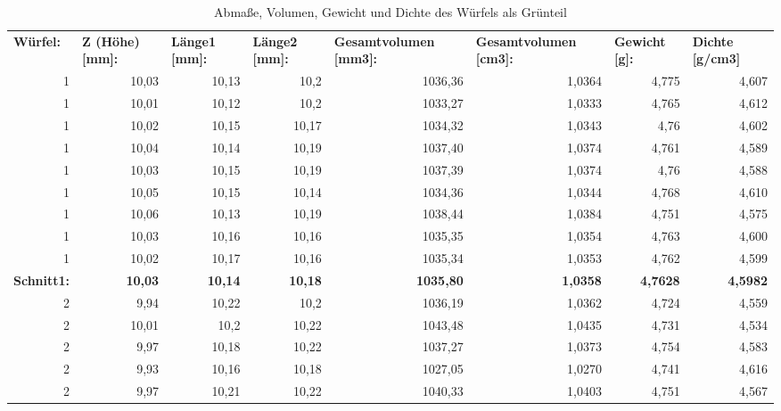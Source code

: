 \begin{table}[htbp]
    \centering
    \caption{Abmaße, Volumen, Gewicht und Dichte des Würfels als Grünteil}
      \begin{tabular}{lrrrrrrr}
      \toprule
      \textbf{Würfel:} & \multicolumn{1}{l}{\textbf{Z (Höhe) [mm]:}} & \multicolumn{1}{l}{\textbf{Länge1 [mm]:}} & \multicolumn{1}{l}{\textbf{Länge2 [mm]:}} & \multicolumn{1}{l}{\textbf{Gesamtvolumen [mm3]:}} & \multicolumn{1}{l}{\textbf{Gesamtvolumen [cm3]:}} & \multicolumn{1}{l}{\textbf{Gewicht [g]:}} & \multicolumn{1}{l}{\textbf{Dichte [g/cm3]}} \\
      \multicolumn{1}{r}{1} & 10,03 & 10,13 & 10,2  & 1036,36 & 1,0364 & 4,775 & 4,607 \\
      \multicolumn{1}{r}{1} & 10,01 & 10,12 & 10,2  & 1033,27 & 1,0333 & 4,765 & 4,612 \\
      \multicolumn{1}{r}{1} & 10,02 & 10,15 & 10,17 & 1034,32 & 1,0343 & 4,76  & 4,602 \\
      \multicolumn{1}{r}{1} & 10,04 & 10,14 & 10,19 & 1037,40 & 1,0374 & 4,761 & 4,589 \\
      \multicolumn{1}{r}{1} & 10,03 & 10,15 & 10,19 & 1037,39 & 1,0374 & 4,76  & 4,588 \\
      \multicolumn{1}{r}{1} & 10,05 & 10,15 & 10,14 & 1034,36 & 1,0344 & 4,768 & 4,610 \\
      \multicolumn{1}{r}{1} & 10,06 & 10,13 & 10,19 & 1038,44 & 1,0384 & 4,751 & 4,575 \\
      \multicolumn{1}{r}{1} & 10,03 & 10,16 & 10,16 & 1035,35 & 1,0354 & 4,763 & 4,600 \\
      \multicolumn{1}{r}{1} & 10,02 & 10,17 & 10,16 & 1035,34 & 1,0353 & 4,762 & 4,599 \\
      \textbf{Schnitt1:} & \textbf{10,03} & \textbf{10,14} & \textbf{10,18} & \textbf{1035,80} & \textbf{1,0358} & \textbf{4,7628} & \textbf{4,5982} \\
      \midrule
      \multicolumn{1}{r}{2} & 9,94  & 10,22 & 10,2  & 1036,19 & 1,0362 & 4,724 & 4,559 \\
      \multicolumn{1}{r}{2} & 10,01 & 10,2  & 10,22 & 1043,48 & 1,0435 & 4,731 & 4,534 \\
      \multicolumn{1}{r}{2} & 9,97  & 10,18 & 10,22 & 1037,27 & 1,0373 & 4,754 & 4,583 \\
      \multicolumn{1}{r}{2} & 9,93  & 10,16 & 10,18 & 1027,05 & 1,0270 & 4,741 & 4,616 \\
      \multicolumn{1}{r}{2} & 9,97  & 10,21 & 10,22 & 1040,33 & 1,0403 & 4,751 & 4,567 \\

\end{tabular}
\end{table}
